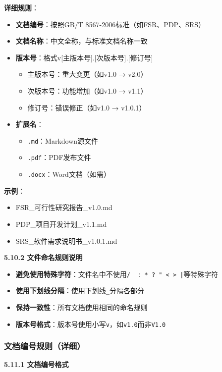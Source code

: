 \documentclass[12pt,a4paper]{article}
\numberwithin{equation}{section}  %
\begin{document}
\textbf{详细规则}：
\begin{itemize}
\item \textbf{文档编号}：按照GB/T 8567-2006标准（如FSR、PDP、SRS）
\item \textbf{文档名称}：中文全称，与标准文档名称一致
\item \textbf{版本号}：格式{\ttfamily v[主版本号].[次版本号].[修订号]}
\begin{itemize}
\item 主版本号：重大变更（如v1.0 → v2.0）
\item 次版本号：功能增加（如v1.0 → v1.1）
\item 修订号：错误修正（如v1.0 → v1.0.1）
\end{itemize}
\item \textbf{扩展名}：
\begin{itemize}
\item \texttt{.md}：Markdown源文件
\item \texttt{.pdf}：PDF发布文件
\item \texttt{.docx}：Word文档（如需）
\end{itemize}
\end{itemize}

\textbf{示例}：
\begin{itemize}
\item {\ttfamily FSR\_可行性研究报告\_v1.0.md}
\item {\ttfamily PDP\_项目开发计划\_v1.1.md}
\item {\ttfamily SRS\_软件需求说明书\_v1.0.1.md}
\end{itemize}

\textbf{5.10.2 文件命名规则说明}

\begin{itemize}
\item \textbf{避免使用特殊字符}：文件名中不使用\texttt{/ \ : * ? " < > |}等特殊字符
\item \textbf{使用下划线分隔}：使用下划线\texttt{\_}分隔各部分
\item \textbf{保持一致性}：所有文档使用相同的命名规则
\item \textbf{版本号格式}：版本号使用小写\texttt{v}，如\texttt{v1.0}而非\texttt{V1.0}
\end{itemize}

\subsubsection{文档编号规则（详细）}
\textbf{5.11.1 文档编号格式}
\end{document}
